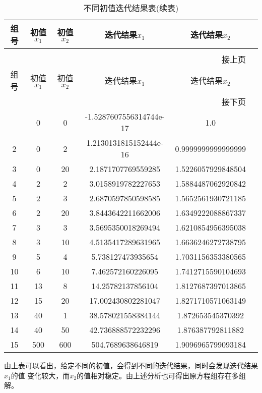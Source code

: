 \documentclass[UTF8,a4paper,12pt]{ctexart}
\begin{document}
\begin{longtable}{cccccc}
    \caption{不同初值迭代结果表}\\\hline
    组号 & 初值$x_1$ & 初值$x_2$ & 迭代结果$x_1$ & 
    \multicolumn{1}{c}{迭代结果$x_2$} \\\hline
    \endfirsthead
    \caption[]{不同初值迭代结果表(续表)}\\
    \multicolumn{5}{r}{\footnotesize 接上页}\\\hline
    组号 & 初值$x_1$ & 初值$x_2$ & 迭代结果$x_1$ & \multicolumn{1}{c}{迭代结果$x_2$}\\
    \hline\endhead
    \hline\multicolumn{5}{r}{\footnotesize 接下页}\\
    \endfoot\hline\hline\endlastfoot
    1  & 0  & 0 & -1.5287607556314744e-17 &  1.0  \\
    2  & 0  & 2 & 1.2130131815152444e-16  & 0.9999999999999999 \\
    3  & 0  & 20 & 2.1871707769559285     & 1.5226057929848504 \\
    4  & 2   & 2 & 3.0158919782227653      &  1.5884487062920842\\
    5  & 2  & 3 & 2.6870597850598585      &  1.5652561930721185\\
    6  & 2 & 20 & 3.8443642211662006     & 1.6349222088867337 \\
    7  & 3  & 3 & 3.5695350018269494      &  1.6210854956395038\\
    8  & 3 & 10 & 4.5135417289631965      & 1.6636246272738795\\
    9  & 5  & 4 & 5.738127473935654       & 1.7031156353380565\\
    10 & 6  & 10 & 7.462572160226095      & 1.7412715590104693\\
    11 & 13 & 8 & 14.25782137856104       & 1.8127687397013865 \\
    12 & 15 & 20 & 17.002430802281047     & 1.8271710571063149 \\
    13 & 40 & 1 & 38.578021558384144      & 1.872653545370392 \\
    14 & 40 & 50 & 42.736888572232296     & 1.876387792811882 \\
    15 & 500 & 600 & 504.7689638646819    & 1.9096965799093184 \\  
\end{longtable} 
由上表可以看出，给定不同的初值，会得到不同的迭代结果，同时会发现迭代结果$x_1$的值
变化较大，而$x_2$的值相对稳定。由上述分析也可得出原方程组存在多组解。 
 
 
\renewcommand\refname{参考文献}
\nocite{*} %
\printbibliography
\end{document}
